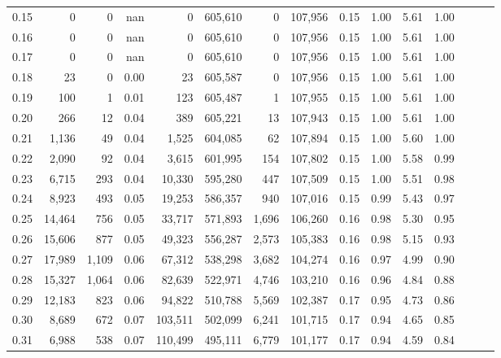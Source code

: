 \begin{tabular}{rrrrrrrrrrrrrrr}
0.15 &       0 &      0 &   nan &        0 &  605,610 &        0 &  107,956 &  0.15 &  1.00 &  5.61 &      1.00 \\
0.16 &       0 &      0 &   nan &        0 &  605,610 &        0 &  107,956 &  0.15 &  1.00 &  5.61 &      1.00 \\
0.17 &       0 &      0 &   nan &        0 &  605,610 &        0 &  107,956 &  0.15 &  1.00 &  5.61 &      1.00 \\
0.18 &      23 &      0 &  0.00 &       23 &  605,587 &        0 &  107,956 &  0.15 &  1.00 &  5.61 &      1.00 \\
0.19 &     100 &      1 &  0.01 &      123 &  605,487 &        1 &  107,955 &  0.15 &  1.00 &  5.61 &      1.00 \\
0.20 &     266 &     12 &  0.04 &      389 &  605,221 &       13 &  107,943 &  0.15 &  1.00 &  5.61 &      1.00 \\
0.21 &   1,136 &     49 &  0.04 &    1,525 &  604,085 &       62 &  107,894 &  0.15 &  1.00 &  5.60 &      1.00 \\
0.22 &   2,090 &     92 &  0.04 &    3,615 &  601,995 &      154 &  107,802 &  0.15 &  1.00 &  5.58 &      0.99 \\
0.23 &   6,715 &    293 &  0.04 &   10,330 &  595,280 &      447 &  107,509 &  0.15 &  1.00 &  5.51 &      0.98 \\
0.24 &   8,923 &    493 &  0.05 &   19,253 &  586,357 &      940 &  107,016 &  0.15 &  0.99 &  5.43 &      0.97 \\
0.25 &  14,464 &    756 &  0.05 &   33,717 &  571,893 &    1,696 &  106,260 &  0.16 &  0.98 &  5.30 &      0.95 \\
0.26 &  15,606 &    877 &  0.05 &   49,323 &  556,287 &    2,573 &  105,383 &  0.16 &  0.98 &  5.15 &      0.93 \\
0.27 &  17,989 &  1,109 &  0.06 &   67,312 &  538,298 &    3,682 &  104,274 &  0.16 &  0.97 &  4.99 &      0.90 \\
0.28 &  15,327 &  1,064 &  0.06 &   82,639 &  522,971 &    4,746 &  103,210 &  0.16 &  0.96 &  4.84 &      0.88 \\
0.29 &  12,183 &    823 &  0.06 &   94,822 &  510,788 &    5,569 &  102,387 &  0.17 &  0.95 &  4.73 &      0.86 \\
0.30 &   8,689 &    672 &  0.07 &  103,511 &  502,099 &    6,241 &  101,715 &  0.17 &  0.94 &  4.65 &      0.85 \\
0.31 &   6,988 &    538 &  0.07 &  110,499 &  495,111 &    6,779 &  101,177 &  0.17 &  0.94 &  4.59 &      0.84 \\

\end{tabular}
